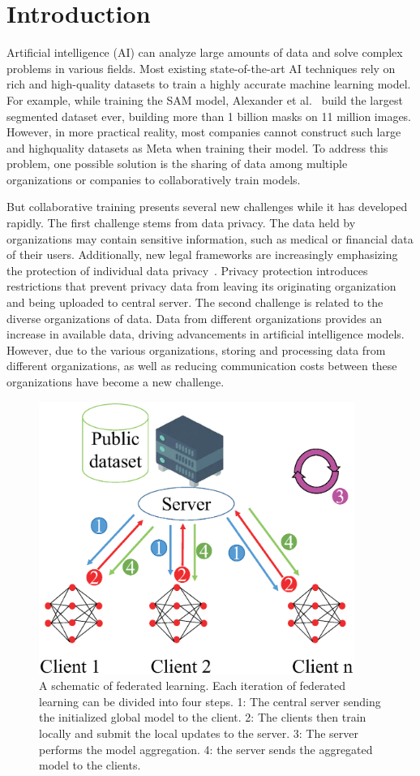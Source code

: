 \documentclass[pdflatex,sn-mathphys-num]{sn-jnl}%
\theoremstyle{thmstyleone}%
\theoremstyle{thmstyletwo}%
\theoremstyle{thmstylethree}%
\begin{document}
\section{Introduction}
Artificial intelligence (AI) can analyze large amounts
of data and solve complex problems in various fields.
Most existing state-of-the-art AI techniques rely on
rich and high-quality datasets to train a highly accurate
machine learning model. For example, while training
the SAM model, Alexander et al.~\cite{kirillov2023segment} build the largest
segmented dataset ever, building more than 1 billion
masks on 11 million images. However, in more practical reality,
most companies cannot construct such large and highquality datasets as Meta when training their model. To
address this problem, one possible solution is the sharing
of data among multiple organizations or companies to
collaboratively train models.

But collaborative training presents several new challenges while it has developed rapidly.
The first challenge stems from data privacy. The data held
by organizations may contain sensitive information, such
as medical or financial data of their users. Additionally,
new legal frameworks are increasingly emphasizing the
protection of individual data privacy~\cite{voigt2017eu}. Privacy protection introduces restrictions that prevent privacy data from
leaving its originating organization and being uploaded
to central server. The second challenge is related to the
diverse organizations of data. Data from different organizations provides an increase in available data, driving
advancements in artificial intelligence models. However,
due to the various organizations, storing and processing
data from different organizations, as well as reducing communication costs between these organizations have
become a new challenge.
\begin{figure}[t]
	\centering

	\includegraphics[width=1.0\linewidth,height=3.5in]{output/fig1.eps}
	\caption{A schematic of federated learning.
		Each iteration of federated learning can be divided into four steps.
		1: The central server sending the initialized global model to the client. 2: The
		clients then train locally and submit the local updates to the server. 3: The server performs the model aggregation.
		4: the server sends the aggregated model to the clients.}
	\label{fig1}
\end{figure}  
\end{document}

